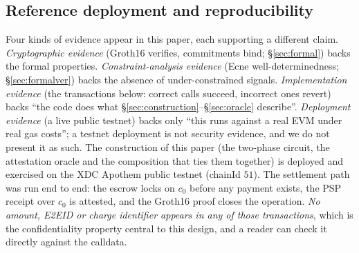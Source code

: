 \documentclass[11pt]{article}
\begin{document}
\subsection{Reference deployment and reproducibility}
Four kinds of evidence appear in this paper, each supporting a different claim.
\emph{Cryptographic evidence} (Groth16 verifies, commitments bind;
\S\ref{sec:formal}) backs the formal properties. \emph{Constraint-analysis
evidence} (Ecne well-determinedness; \S\ref{sec:formalver}) backs the absence of
under-constrained signals. \emph{Implementation evidence} (the transactions
below: correct calls succeed, incorrect ones revert) backs ``the code does what
\S\ref{sec:construction}--\S\ref{sec:oracle} describe''. \emph{Deployment
evidence} (a live public testnet) backs only ``this runs against a real EVM
under real gas costs''; a testnet deployment is not security evidence, and we
do not present it as such. The construction of this paper (the two-phase
circuit, the attestation oracle and the composition that ties them together) is
deployed and exercised on the XDC Apothem public testnet (chainId $51$). The
settlement path was run end to end: the escrow locks on $c_0$ before any payment
exists, the PSP receipt over $c_0$ is attested, and the Groth16 proof closes the
operation. \emph{No amount, E2EID or charge identifier appears in any of those
transactions}, which is the confidentiality property central to this design,
and a reader can check it directly against the calldata.
\end{document}
